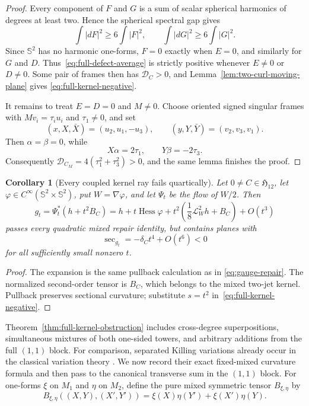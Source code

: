 \documentclass[11pt]{amsart}
\newtheorem{corollary}[theorem]{Corollary}
\theoremstyle{definition}
\theoremstyle{remark}
\DeclareMathOperator{\Hess}{Hess}
\DeclareMathOperator{\secop}{sec}
\newcommand{\Sph}{\mathbb S}
\begin{document}
\begin{proof}
Every component of $F$ and $G$ is a sum of scalar spherical harmonics
of degrees at least two.  Hence the spherical spectral gap gives
\[
 \int|dF|^2\geq6\int|F|^2,
 \qquad
 \int|dG|^2\geq6\int|G|^2.
\]
Since $\Sph^2$ has no harmonic one-forms, $F=0$ exactly when $E=0$,
and similarly for $G$ and $D$.
Thus~\eqref{eq:full-defect-average} is strictly positive whenever
$E\neq0$ or $D\neq0$.  Some pair of frames then has
$\mathcal D_C>0$, and Lemma~\ref{lem:two-curl-moving-plane} gives
\eqref{eq:full-kernel-negative}.

It remains to treat $E=D=0$ and $M\neq0$.  Choose oriented signed
singular frames with $Mv_i=\tau_i u_i$ and $\tau_1\neq0$, and set
\[
 (x,X,\bar X)=(u_2,u_1,-u_3),
 \qquad
 (y,Y,\bar Y)=(v_2,v_3,v_1).
\]
Then $\alpha=\beta=0$, while
\[
 X\alpha=2\tau_1,
 \qquad
 Y\beta=-2\tau_3.
\]
Consequently
$\mathcal D_{C_M}=4(\tau_1^2+\tau_3^2)>0$, and the same lemma finishes
the proof.
\end{proof}

\begin{corollary}[Every coupled kernel ray fails quartically]
\label{cor:coupled-kernel-repair}
Let $0\neq C\in\mathfrak H_{12}$, let
$\varphi\in C^\infty(\Sph^2\times\Sph^2)$, put $W=\nabla\varphi$,
and let $\Psi_t$ be the flow of $W/2$.  Then
\begin{equation}\label{eq:coupled-kernel-corrected-path}
 g_t=\Psi_t^*(h+t^2B_C)
 =h+t\Hess\varphi+t^2
   \left(\frac18\mathcal L_W^2h+B_C\right)+O(t^3)
\end{equation}
passes every quadratic mixed repair identity, but contains planes with
\begin{equation}\label{eq:coupled-kernel-quartic-obstruction}
 \secop_{g_t}=-\delta_Ct^4+O(t^6)<0
\end{equation}
for all sufficiently small nonzero $t$.
\end{corollary}

\begin{proof}
The expansion is the same pullback calculation as in
\eqref{eq:gauge-repair}.  The normalized second-order tensor is $B_C$,
which belongs to the mixed two-jet kernel.  Pullback preserves sectional
curvature; substitute $s=t^2$ in~\eqref{eq:full-kernel-negative}.
\end{proof}

Theorem~\ref{thm:full-kernel-obstruction} includes cross-degree
superpositions, simultaneous mixtures of both one-sided towers, and
arbitrary additions from the full $(1,1)$ block.  For comparison,
separated Killing variations already
occur in the classical variation theory
\cite{BourguignonDeschampsSentenac1973}.  We now record their exact
fixed-mixed curvature formula and then pass to the canonical transverse
sum in the $(1,1)$ block.  For one-forms $\xi$ on $M_1$ and $\eta$ on
$M_2$, define
the pure mixed symmetric tensor $B_{\xi,\eta}$ by
\begin{equation}\label{eq:separated-kernel-tensor}
 B_{\xi,\eta}((X,Y),(X',Y'))
 =\xi(X)\eta(Y')+\xi(X')\eta(Y).
\end{equation}
\end{document}

